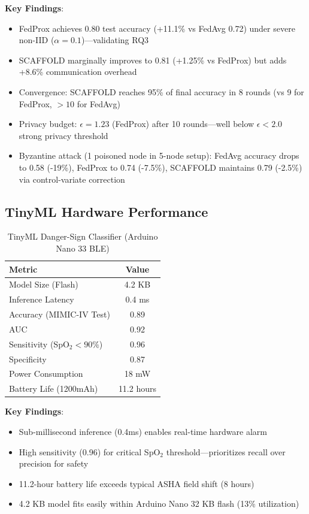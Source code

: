 \documentclass[conference,compsoc]{IEEEtran}
\begin{document}
\textbf{Key Findings}:
\begin{itemize}
    \item FedProx achieves 0.80 test accuracy (+11.1\% vs FedAvg 0.72) under severe non-IID (\(\alpha=0.1\))—validating RQ3
    \item SCAFFOLD marginally improves to 0.81 (+1.25\% vs FedProx) but adds +8.6\% communication overhead
    \item Convergence: SCAFFOLD reaches 95\% of final accuracy in 8 rounds (vs 9 for FedProx, \(>10\) for FedAvg)
    \item Privacy budget: \(\epsilon=1.23\) (FedProx) after 10 rounds—well below \(\epsilon < 2.0\) strong privacy threshold
    \item Byzantine attack (1 poisoned node in 5-node setup): FedAvg accuracy drops to 0.58 (-19\%), FedProx to 0.74 (-7.5\%), SCAFFOLD maintains 0.79 (-2.5\%) via control-variate correction
\end{itemize}

\subsection{TinyML Hardware Performance}

\begin{table}[h]
\centering
\caption{TinyML Danger-Sign Classifier (Arduino Nano 33 BLE)}
\label{tab:tinyml}
\footnotesize
\begin{tabular}{@{}lc@{}}
\toprule
\textbf{Metric} & \textbf{Value} \\ \midrule
Model Size (Flash) & 4.2 KB \\
Inference Latency & 0.4 ms \\
Accuracy (MIMIC-IV Test) & 0.89 \\
AUC & 0.92 \\
Sensitivity (SpO\(_2 < 90\%\)) & 0.96 \\
Specificity & 0.87 \\
Power Consumption & 18 mW \\
Battery Life (1200mAh) & 11.2 hours \\
\bottomrule
\end{tabular}
\end{table}

\textbf{Key Findings}:
\begin{itemize}
    \item Sub-millisecond inference (0.4ms) enables real-time hardware alarm
    \item High sensitivity (0.96) for critical SpO\(_2\) threshold—prioritizes recall over precision for safety
    \item 11.2-hour battery life exceeds typical ASHA field shift (8 hours)
    \item 4.2 KB model fits easily within Arduino Nano 32 KB flash (13\% utilization)
\end{itemize}
\end{document}
